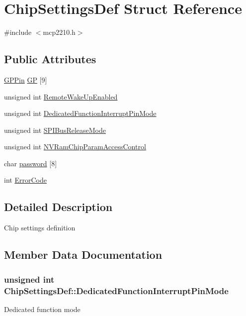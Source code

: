 \hypertarget{struct_chip_settings_def}{\section{\-Chip\-Settings\-Def \-Struct \-Reference}
\label{struct_chip_settings_def}
}


{\ttfamily \#include $<$mcp2210.\-h$>$}

\subsection*{\-Public \-Attributes}
\begin{DoxyCompactItemize}
\item 
\hyperlink{struct_g_p_pin}{\-G\-P\-Pin} \hyperlink{struct_chip_settings_def_aea8065ee4c940dcbde93dd1633c63f38}{\-G\-P} \mbox{[}9\mbox{]}
\item 
unsigned int \hyperlink{struct_chip_settings_def_a5a29397e3fd6793de5d8d348b3b11d22}{\-Remote\-Wake\-Up\-Enabled}
\item 
unsigned int \hyperlink{struct_chip_settings_def_af61e2aaa5bcf3284abd4554d2be88002}{\-Dedicated\-Function\-Interrupt\-Pin\-Mode}
\item 
unsigned int \hyperlink{struct_chip_settings_def_abeaf6785170c987a19025a506cf14a8d}{\-S\-P\-I\-Bus\-Release\-Mode}
\item 
unsigned int \hyperlink{struct_chip_settings_def_a56bcb330a04c9b6b108ee63ce635c92d}{\-N\-V\-Ram\-Chip\-Param\-Access\-Control}
\item 
char \hyperlink{struct_chip_settings_def_a0e9e9123c42b18bdd6294d0ae7935582}{password} \mbox{[}8\mbox{]}
\item 
int \hyperlink{struct_chip_settings_def_a711cd7ddde92dcfefaba6863b303ab3d}{\-Error\-Code}
\end{DoxyCompactItemize}


\subsection{\-Detailed \-Description}
\-Chip settings definition 

\subsection{\-Member \-Data \-Documentation}
\hypertarget{struct_chip_settings_def_af61e2aaa5bcf3284abd4554d2be88002}{
\subsubsection[{\-Dedicated\-Function\-Interrupt\-Pin\-Mode}]{\setlength{\rightskip}{0pt plus 5cm}unsigned int {\bf \-Chip\-Settings\-Def\-::\-Dedicated\-Function\-Interrupt\-Pin\-Mode}}}\label{struct_chip_settings_def_af61e2aaa5bcf3284abd4554d2be88002}
\-Dedicated function mode

